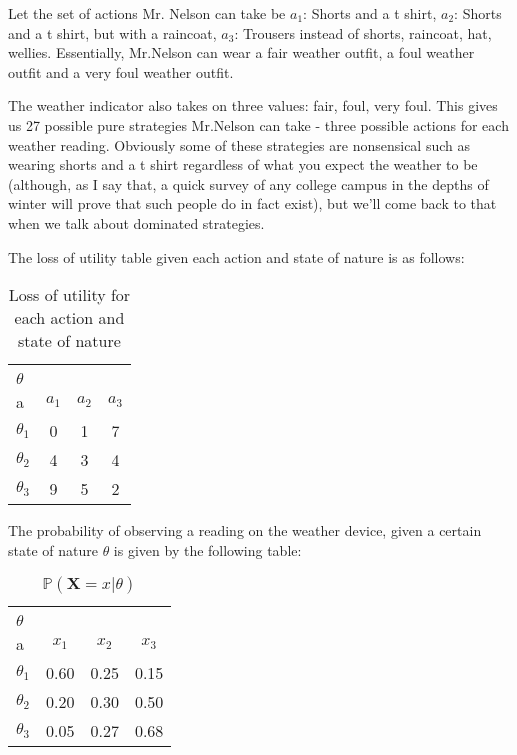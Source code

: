 \documentclass{article}
\begin{document}
Let the set of actions Mr. Nelson can take be $a_1$: Shorts and a t shirt, $a_2$: Shorts and a t shirt, but with a raincoat, $a_3$: Trousers instead of shorts, raincoat, hat, wellies. Essentially, Mr.Nelson can wear a fair weather outfit, a foul weather outfit and a very foul weather outfit.  

The weather indicator also takes on three values: fair, foul, very foul. This gives us 27 possible pure strategies Mr.Nelson can take - three possible actions for each weather reading. Obviously some of these strategies are nonsensical such as wearing shorts and a t shirt regardless of what you expect the weather to be (although, as I say that, a quick survey of any college campus in the depths of winter will prove that such people do in fact exist), but we'll come back to that when we talk about dominated strategies. 

The loss of utility table given each action and state of nature is as follows:

\begin{table}[htb]
\begin{center}
    
\begin{tabular}{|l|c|c|c|}\hline
\diagbox[width=5em]{\\$\theta$}{\\a}&
  $a_1$ & $a_2$ & $a_3$ \\ \hline
  $\theta_1$ & 0 & 1 & 7 \\ \hline
  $\theta_2$ & 4 & 3 & 4 \\ \hline
  $\theta_3$ & 9 & 5 & 2 \\ \hline
\end{tabular}
\end{center}
\caption{Loss of utility for each action and state of nature}
\end{table}



The probability of observing a reading on the weather device, given a certain state of nature $\theta$ is given by the following table:

\begin{table}[htb]
\begin{center}
    
\begin{tabular}{|l|c|c|c|}\hline
\diagbox[width=5em]{\\$\theta$}{\\a}&
  $x_1$ & $x_2$ & $x_3$ \\ \hline
  $\theta_1$ & 0.60 & 0.25 & 0.15 \\ \hline
  $\theta_2$ & 0.20 & 0.30 & 0.50 \\ \hline
  $\theta_3$ & 0.05 & 0.27 & 0.68 \\ \hline
\end{tabular}
\end{center}
\caption{$\mathbb{P}(\textbf{X}=x|\theta)$}
\end{table}
\end{document}
